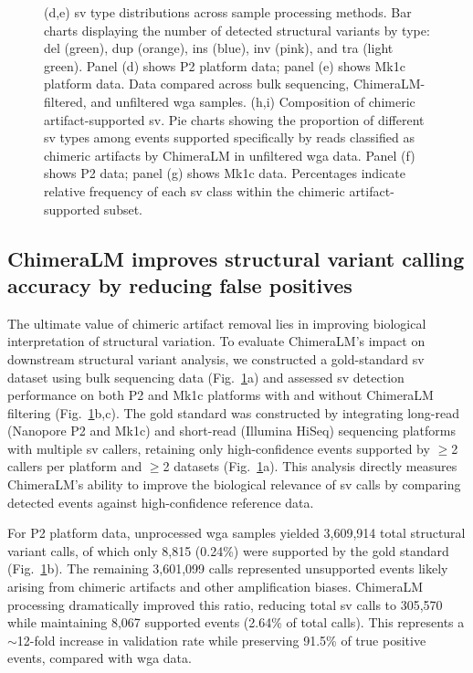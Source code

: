 \documentclass[pdflatex,sn-nature]{sn-jnl}%
\theoremstyle{thmstyleone}%
\theoremstyle{thmstyletwo}%
\theoremstyle{thmstylethree}%
\begin{document}
\begin{figure}[!ht]
{		(d,e) \gls{sv} type distributions across sample processing methods. Bar charts displaying the number of detected structural variants by type: \gls{del} (green), \gls{dup} (orange), \gls{ins} (blue), \gls{inv} (pink), and \gls{tra} (light green). Panel (d) shows P2 platform data; panel (e) shows Mk1c platform data. Data compared across bulk sequencing, ChimeraLM-filtered, and unfiltered \gls{wga} samples.
		(h,i) Composition of chimeric artifact-supported \gls{sv}. Pie charts showing the proportion of different \gls{sv} types among events supported specifically by reads classified as chimeric artifacts by ChimeraLM in unfiltered \gls{wga} data. Panel (f) shows P2 data; panel (g) shows Mk1c data. Percentages indicate relative frequency of each \gls{sv} class within the chimeric artifact-supported subset.}\label{fig:figure3}
\end{figure}

\subsection*{ChimeraLM improves structural variant calling accuracy by reducing false positives}

The ultimate value of chimeric artifact removal lies in improving biological interpretation of structural variation.
To evaluate ChimeraLM's impact on downstream structural variant analysis, we constructed a gold-standard \gls{sv} dataset using bulk sequencing data (Fig.~\ref{fig:figure3}a) and assessed \gls{sv} detection performance on both P2 and Mk1c platforms with and without ChimeraLM filtering (Fig.~\ref{fig:figure3}b,c).
The gold standard was constructed by integrating long-read (Nanopore P2 and Mk1c) and short-read (Illumina HiSeq) sequencing platforms with multiple \gls{sv} callers, retaining only high-confidence events supported by $\geq$2 callers per platform and $\geq$2 datasets (Fig.~\ref{fig:figure3}a).
This analysis directly measures ChimeraLM's ability to improve the biological relevance of \gls{sv} calls by comparing detected events against high-confidence reference data.

For P2 platform data, unprocessed \gls{wga} samples yielded 3,609,914 total structural variant calls, of which only 8,815 (0.24\%) were supported by the gold standard (Fig.~\ref{fig:figure3}b).
The remaining 3,601,099 calls represented unsupported events likely arising from chimeric artifacts and other amplification biases.
ChimeraLM processing dramatically improved this ratio, reducing total \gls{sv} calls to 305,570 while maintaining 8,067 supported events (2.64\% of total calls).
This represents a $\sim$12-fold increase in validation rate while preserving 91.5\% of true positive events, compared with \gls{wga} data.
\end{document}
